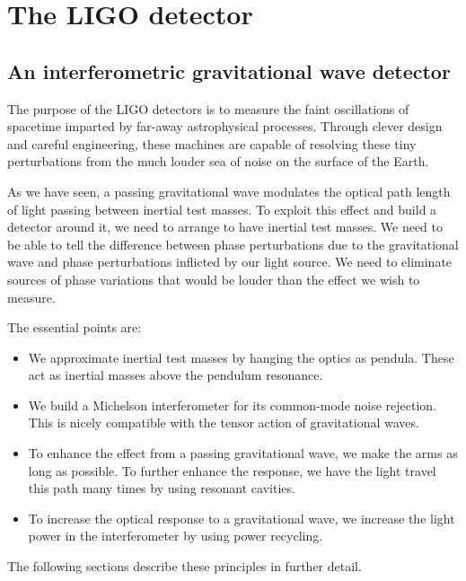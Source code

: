 \chapter{The LIGO detector}
\label{chapter2}

\section{An interferometric gravitational wave detector}

The purpose of the LIGO detectors is to measure the faint
oscillations of spacetime imparted by far-away astrophysical
processes.  Through clever design and careful engineering, these
machines are capable of resolving these tiny perturbations from the
much louder sea of noise on the surface of the Earth\cite{Saulson1994Fundamentals}.

As we have seen, a passing gravitational wave modulates the optical
path length of light passing between inertial test
masses.  To exploit this effect and build a detector around it, we
need to arrange to have inertial test masses.  We need to be able to
tell the difference between phase perturbations due to the
gravitational wave and phase perturbations inflicted by our light
source.  We need to eliminate sources of phase variations that would
be louder than the effect we wish to measure.  

The essential points are:
\begin{itemize}
\item We approximate inertial test masses by hanging the optics as
  pendula.  These act as inertial masses above the pendulum resonance.
\item We build a Michelson interferometer for its common-mode noise
  rejection.  This is nicely compatible with the tensor action of
  gravitational waves.
\item To enhance the effect from a passing gravitational wave, we make
  the arms as long as possible.  To further enhance the response, we
  have the light travel this path many times by using resonant cavities.
\item To increase the optical response to a gravitational wave, we
  increase the light power in the interferometer by using power
  recycling.
\end{itemize}
The following sections describe these principles in further detail.
